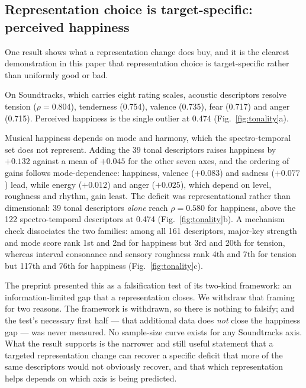 \subsection{Representation choice is target-specific: perceived happiness}
\label{sec:tonality}

One result shows what a representation change does buy, and it is the clearest
demonstration in this paper that representation choice is target-specific
rather than uniformly good or bad.

On Soundtracks, which carries eight rating scales, acoustic descriptors
resolve tension ($\rho = 0.804$), tenderness (0.754), valence (0.735), fear
(0.717) and anger (0.715). Perceived happiness is the single outlier at 0.474
(Fig.~\ref{fig:tonality}a).

Musical happiness depends on mode and harmony, which the spectro-temporal set
does not represent. Adding the 39 tonal descriptors raises happiness by
$+0.132$ against a mean of $+0.045$ for the other seven axes, and the ordering
of gains follows mode-dependence: happiness, valence ($+0.083$) and sadness
($+0.077$) lead, while energy ($+0.012$) and anger ($+0.025$), which depend on
level, roughness and rhythm, gain least. The deficit was representational
rather than dimensional: 39 tonal descriptors \emph{alone} reach $\rho =
0.580$ for happiness, above the 122 spectro-temporal descriptors at 0.474
(Fig.~\ref{fig:tonality}b). A mechanism check dissociates the two families:
among all 161 descriptors, major-key strength and mode score rank 1st and 2nd
for happiness but 3rd and 20th for tension, whereas interval consonance and
sensory roughness rank 4th and 7th for tension but 117th and 76th for
happiness (Fig.~\ref{fig:tonality}c).

The preprint presented this as a falsification test of its two-kind
framework: an information-limited gap that a representation closes. We
withdraw that framing for two reasons. The framework is withdrawn, so there is
nothing to falsify; and the test's necessary first half --- that additional
data does \emph{not} close the happiness gap --- was never measured. No
sample-size curve exists for any Soundtracks axis. What the result supports is
the narrower and still useful statement that a targeted representation change
can recover a specific deficit that more of the same descriptors would not
obviously recover, and that which representation helps depends on which axis
is being predicted.

